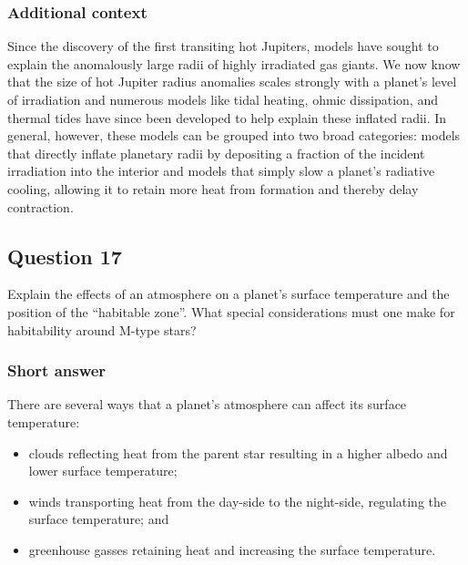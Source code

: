 \documentclass[a4paper,10pt]{article}
\begin{document}
\subsubsection{Additional context}

Since the discovery of the first transiting hot Jupiters, models have sought to explain the anomalously large radii of highly irradiated gas giants. We now know that the size of hot Jupiter radius anomalies scales strongly with a planet's level of irradiation and numerous models like tidal heating, ohmic dissipation, and thermal tides have since been developed to help explain these inflated radii. In general, however, these models can be grouped into two broad categories: models that directly inflate planetary radii by depositing a fraction of the incident irradiation into the interior and models that simply slow a planet's radiative cooling, allowing it to retain more heat from formation and thereby delay contraction.


\newpage
\subsection{Question 17}

Explain the effects of an atmosphere on a planet's surface temperature and the position of the “habitable zone”. What special considerations must one make for habitability around M-type stars?

\subsubsection{Short answer}

There are several ways that a planet's atmosphere can affect its surface temperature:

\begin{itemize}
    \item clouds reflecting heat from the parent star resulting in a higher albedo and lower surface temperature;
    \item winds transporting heat from the day-side to the night-side, regulating the surface temperature; and
    \item greenhouse gasses retaining heat and increasing the surface temperature.
\end{itemize}
\end{document}
